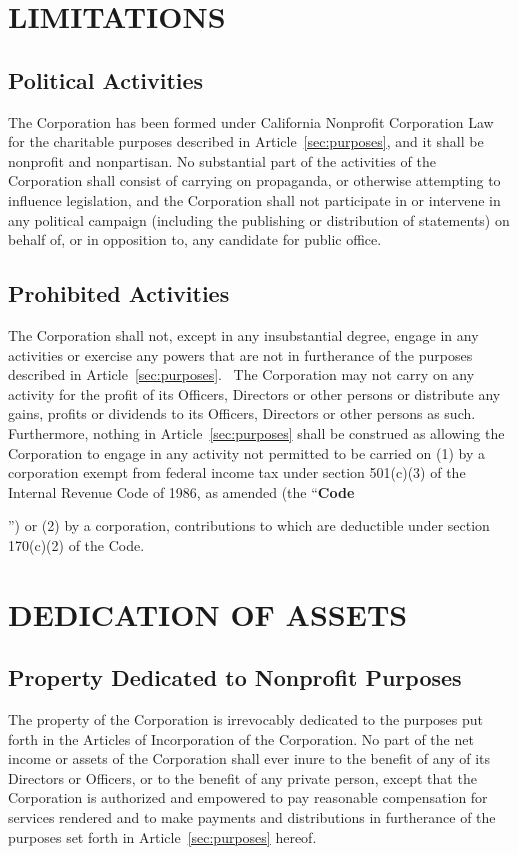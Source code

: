 \documentclass[letterpaper,titlepage]{article}
\newcommand{\defn}[1]{\refstepcounter{defn}\textbf{#1}\addcontentsline{defn}{defn}{\protect\numberline{\thedefn}#1}}
\begin{document}
\section{LIMITATIONS}
\label{sec:limitations}
\subsection{Political Activities}
\label{sec:politicalActivities}
The Corporation has been formed under California Nonprofit Corporation Law for
the charitable purposes described in Article~\ref{sec:purposes}, and it shall
be nonprofit and nonpartisan. No substantial part of the activities of the
Corporation shall consist of carrying on propaganda, or otherwise attempting to
influence legislation, and the Corporation shall not participate in or
intervene in any political campaign (including the publishing or distribution
of statements) on behalf of, or in opposition to, any candidate for public
office.
\subsection{Prohibited Activities}
\label{sec:prohibitedActivities}
The Corporation shall not, except in any insubstantial degree, engage in any
activities or exercise any powers that are not in furtherance of the purposes
described in Article~\ref{sec:purposes}.  The Corporation may not carry on any
activity for the profit of its Officers, Directors or other persons or
distribute any gains, profits or dividends to its Officers, Directors or other
persons as such.  Furthermore, nothing in Article~\ref{sec:purposes} shall be
construed as allowing the Corporation to engage in any activity not permitted
to be carried on (1) by a corporation exempt from federal income tax under
section 501(c)(3) of the Internal Revenue Code of 1986, as amended (the
``\defn{Code}'') or (2) by a corporation, contributions to which are deductible
under section 170(c)(2) of the Code.
\section{DEDICATION OF ASSETS}
\label{sec:dedicationAssets}
\subsection{Property Dedicated to Nonprofit Purposes}
\label{sec:propertyDedicated}
The property of the Corporation is irrevocably dedicated to the purposes put
forth in the Articles of Incorporation of the Corporation. No part of the net
income or assets of the Corporation shall ever inure to the benefit of any of
its Directors or Officers, or to the benefit of any private person, except that
the Corporation is authorized and empowered to pay reasonable compensation for
services rendered and to make payments and distributions in furtherance of the
purposes set forth in Article~\ref{sec:purposes} hereof.
\end{document}
